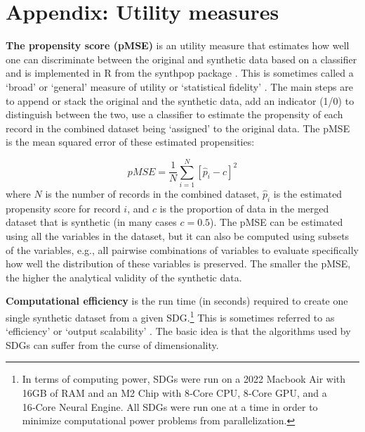 \documentclass[runningheads]{llncs}
\begin{document}





\appendix
\section{Appendix: Utility measures}\label{appendix:utility_measures}
\setcounter{figure}{0}    
\setcounter{table}{0}    

{\bf The propensity score (pMSE)}  is an utility measure that estimates how well one can discriminate between the original and synthetic data based on a classifier \cite{woo2009global,snoke2018general} and is implemented in \textsf{R} from the synthpop package \cite{nowok2016synthpop}.  This is sometimes called a `broad'\cite{snoke2018general} or `general'\cite{drechsler2009disclosure} measure of utility or `statistical fidelity' \cite{jordon2022synthetic}.  The main steps are to append or stack the original and the synthetic data, add an indicator (1/0) to distinguish between the two, use a classifier to estimate the propensity of each record in the combined dataset being `assigned' to the original data. The pMSE is the mean squared error of these estimated propensities:

\begin{equation}
pMSE = \frac{1}{N}\sum_{i=1}^{N}[\hat{p}_i - c]^2
\end{equation}
where $N$ is the number of records in the combined dataset, $\hat{p}_i$ is the estimated propensity score for record $i$, and $c$ is the proportion of data in the merged dataset that is synthetic (in many cases $c=0.5$). The pMSE can be estimated using all the variables in the dataset, but it can also be computed using subsets of the variables, e.g., all pairwise combinations of variables to evaluate specifically how well the distribution of these variables is preserved. The smaller the pMSE, the higher the analytical validity of the synthetic data.


{\bf Computational efficiency} is the run time (in seconds) required to create one single synthetic dataset from a given SDG.\footnote{In terms of computing power, SDGs were run on a 2022 Macbook Air with 16GB of RAM and an M2 Chip with 8‑Core CPU, 8‑Core GPU, and a 16‑Core Neural Engine.  All SDGs were run one at a time in order to minimize computational power problems from parallelization.}  This is sometimes referred to as `efficiency'\cite{jordon2022synthetic} or `output scalability' \cite{zhang2017privbayes}.  The basic idea is that the algorithms used by SDGs can suffer from the curse of dimensionality.  
\end{document}
